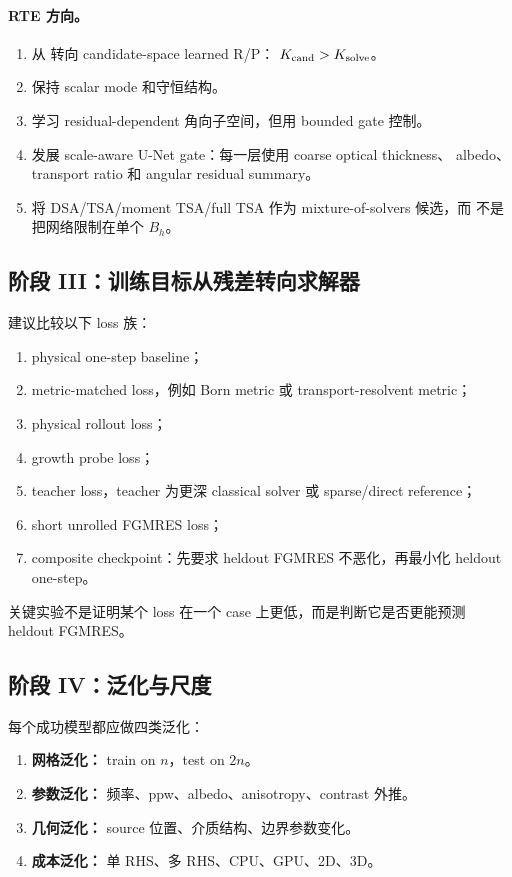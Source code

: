 \documentclass[UTF8,11pt,fontset=fandol]{ctexart}
\newcommand{\code}[1]{\texttt{\detokenize{#1}}}
\begin{document}
\paragraph{RTE 方向。}
\begin{enumerate}[leftmargin=2em]
  \item 从 \code{CoeffWeighted} 转向 candidate-space learned R/P：
  \(K_{\rm cand}>K_{\rm solve}\)。
  \item 保持 scalar mode 和守恒结构。
  \item 学习 residual-dependent 角向子空间，但用 bounded gate 控制。
  \item 发展 scale-aware U-Net gate：每一层使用 coarse optical thickness、
  albedo、transport ratio 和 angular residual summary。
  \item 将 DSA/TSA/moment TSA/full TSA 作为 mixture-of-solvers 候选，而
  不是把网络限制在单个 \(B_h\)。
\end{enumerate}

\subsection{阶段 III：训练目标从残差转向求解器}

建议比较以下 loss 族：
\begin{enumerate}[leftmargin=2em]
  \item physical one-step baseline；
  \item metric-matched loss，例如 Born metric 或 transport-resolvent metric；
  \item physical rollout loss；
  \item growth probe loss；
  \item teacher loss，teacher 为更深 classical solver 或 sparse/direct
  reference；
  \item short unrolled FGMRES loss；
  \item composite checkpoint：先要求 heldout FGMRES 不恶化，再最小化 heldout
  one-step。
\end{enumerate}

关键实验不是证明某个 loss 在一个 case 上更低，而是判断它是否更能预测
heldout FGMRES。

\subsection{阶段 IV：泛化与尺度}

每个成功模型都应做四类泛化：
\begin{enumerate}[leftmargin=2em]
  \item \textbf{网格泛化：} train on \(n\)，test on \(2n\)。
  \item \textbf{参数泛化：} 频率、ppw、albedo、anisotropy、contrast 外推。
  \item \textbf{几何泛化：} source 位置、介质结构、边界参数变化。
  \item \textbf{成本泛化：} 单 RHS、多 RHS、CPU、GPU、2D、3D。
\end{enumerate}
\end{document}
